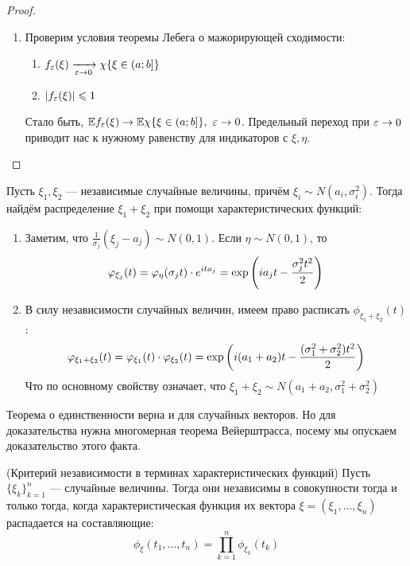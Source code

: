 \begin{proof}
\begin{itemize}
\begin{enumerate}
			\item Проверим условия теоремы Лебега о мажорирующей сходимости:
			\begin{enumerate}
				\item $f_{\varepsilon}(\xi) \xrightarrow[\varepsilon \to 0]{} \chi\{\xi \in \left(a; b\right]\}$
				
				\item $|f_{\varepsilon}(\xi)| \leqslant 1$
			\end{enumerate}
			Стало быть, $\mathbb{E} f_{\varepsilon}(\xi) \to \mathbb{E} \chi\{\xi \in \left(a; b\right]\},\ \varepsilon \to 0$. Предельный переход при $\varepsilon \to 0$ приводит нас к нужному равенству для индикаторов с $\xi, \eta$.
		\end{enumerate}
	\end{itemize}
\end{proof}

\begin{example}
	Пусть $\xi_1, \xi_2$ --- независимые случайные величины, причём $\xi_i \sim N(a_i, \sigma_i^2)$. Тогда найдём распределение $\xi_1 + \xi_2$ при помощи характеристических функций:
	\begin{enumerate}
		\item Заметим, что $\frac{1}{\sigma_j}(\xi_j - a_j) \sim N(0, 1)$. Если $\eta \sim N(0, 1)$, то
		\[
			\varphi_{\xi_j}(t) = \varphi_\eta(\sigma_j t) \cdot e^{ita_j} = \exp\left(ia_jt - \frac{\sigma_j^2 t^2}{2}\right)
		\]
		
		\item В силу независимости случайных величин, имеем право расписать $\phi_{\xi_1 + \xi_2}(t)$:
		\[
			\varphi_{\xi_1 + \xi_2}(t) = \varphi_{\xi_1}(t) \cdot \varphi_{\xi_2}(t) = \exp\left(i(a_1 + a_2)t - \frac{(\sigma_1^2 + \sigma_2^2)t^2}{2}\right)
		\]
		Что по основному свойству означает, что $\xi_1 + \xi_2 \sim N(a_1 + a_2, \sigma_1^2 + \sigma_2^2)$
	\end{enumerate}
\end{example}

\begin{note}
	Теорема о единственности верна и для случайных векторов. Но для доказательства нужна многомерная теорема Вейерштрасса, посему мы опускаем доказательство этого факта.
\end{note}

\begin{theorem} (Критерий независимости в терминах характеристических функций)
	Пусть $\{\xi_k\}_{k = 1}^n$ --- случайные величины. Тогда они независимы в совокупности тогда и только тогда, когда характеристическая функция их вектора $\xi = (\xi_1, \ldots, \xi_n)$ распадается на составляющие:
	\[
		\phi_\xi(t_1, \ldots, t_n) = \prod_{k = 1}^n \phi_{\xi_k}(t_k)
	\]
\end{theorem}

